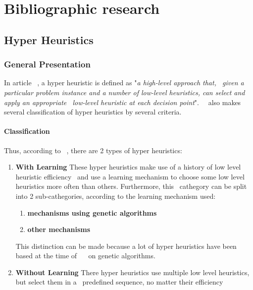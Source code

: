 \chapter{Bibliographic research}
\label{ch:research}

\section{Hyper Heuristics}
\label{sec:research-hh}

\subsection{General Presentation}
\label{subsec:research-general-hh}

In article ~\cite{MetaHeuristicsHandbook}, a hyper heuristic is defined as "\textit{a high-level approach that, \
given a particular problem instance and a number of low-level heuristics, can select and apply an appropriate \
low-level heuristic at each decision point}".\
~\cite{MetaHeuristicsHandbook} also makes several classification of hyper heuristics by several criteria.

\subsubsection{Classification}
\label{subsubsec:research-hh-classification}

Thus, according to ~\cite{soubeiga}, there are 2 types of hyper heuristics:
\begin{enumerate}
    \item \textbf{With Learning} These hyper heuristics make use of a history of low level heuristic efficiency \
and use a learning mechanism to choose some low level heuristics more often than others. Furthermore, this \
cathegory can be split into 2 sub-cathegories, according to the learning mechanism used:
    \begin{enumerate}
        \item \textbf{mechanisms using genetic algorithms}
        \item \textbf{other mechanisms}
    \end{enumerate}
    This distinction can be made because a lot of hyper heuristics have been based at the time of ~\cite{soubeiga} \
on genetic algorithms.
    \item \textbf{Without Learning} There hyper heuristics use multiple low level heuristics, but select them in a \
predefined sequence, no matter their efficiency
\end{enumerate}

